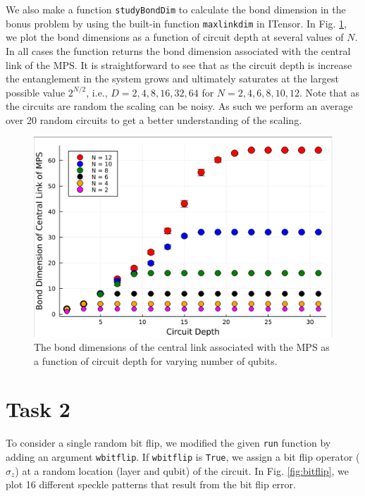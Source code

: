 \documentclass[12pt]{article}
\begin{document}
We also make a function \texttt{studyBondDim} to calculate the bond dimension in the bonus problem by using the built-in function \texttt{maxlinkdim} in ITensor. In Fig. \ref{fig:bonddim}, we plot the bond dimensions as a function of circuit depth at several values of $N$. In all cases the function returns the bond dimension associated with the central link of the MPS. It is straightforward to see that as the circuit depth is increase the entanglement in the system grows and ultimately saturates at the largest possible value $2^{N/2}$, i.e., $D = 2, 4, 8, 16, 32, 64$ for $N = 2, 4, 6, 8, 10 ,12$. Note that as the circuits are random the scaling can be noisy. As such we perform an average over 20 random circuits to get a better understanding of the scaling. 

\begin{figure}[t]
	\centering
	\includegraphics [width=0.8\linewidth] {figures/Task1b}
	\caption{
		The bond dimensions of the central link associated with the MPS as a function of circuit depth for varying number of qubits.}
	\label{fig:bonddim}
\end{figure}


\section*{Task 2}

To consider a single random bit flip, we modified the given \texttt{run} function by adding an argument \texttt{wbitflip}. If \texttt{wbitflip} is \texttt{True}, we assign a bit flip operator ($\hat{\sigma}_z$) at a random location (layer and qubit) of the circuit. In Fig. \ref{fig:bitflip}, we plot 16 different speckle patterns that result from the bit flip error.
\end{document}
